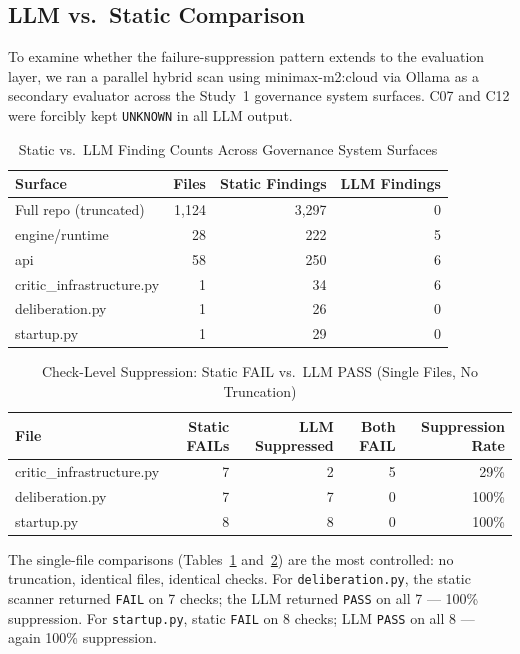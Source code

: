 \documentclass[11pt]{article}
\begin{document}
\subsection{LLM vs.\ Static Comparison}
\label{sec:llm}

To examine whether the failure-suppression pattern extends to the evaluation layer, we ran
a parallel hybrid scan using minimax-m2:cloud via Ollama as a secondary evaluator across the
Study~1 governance system surfaces. C07 and C12 were forcibly kept \texttt{UNKNOWN} in all
LLM output.

\begin{table}[htbp]
\centering
\caption{Static vs.\ LLM Finding Counts Across Governance System Surfaces}
\label{tab:llm}
\small
\begin{tabular}{@{}lrrr@{}}
\toprule
\textbf{Surface} & \textbf{Files} & \textbf{Static Findings} & \textbf{LLM Findings} \\
\midrule
Full repo (truncated) & 1,124 & 3,297 & 0 \\
engine/runtime & 28 & 222 & 5 \\
api & 58 & 250 & 6 \\
critic\_infrastructure.py & 1 & 34 & 6 \\
deliberation.py & 1 & 26 & 0 \\
startup.py & 1 & 29 & 0 \\
\bottomrule
\end{tabular}
\end{table}

\begin{table}[htbp]
\centering
\caption{Check-Level Suppression: Static FAIL vs.\ LLM PASS (Single Files, No Truncation)}
\label{tab:suppression}
\small
\begin{tabular}{@{}lrrrr@{}}
\toprule
\textbf{File} & \textbf{Static FAILs} & \textbf{LLM Suppressed} &
\textbf{Both FAIL} & \textbf{Suppression Rate} \\
\midrule
critic\_infrastructure.py & 7 & 2 & 5 & 29\% \\
deliberation.py & 7 & 7 & 0 & 100\% \\
startup.py & 8 & 8 & 0 & 100\% \\
\bottomrule
\end{tabular}
\end{table}

The single-file comparisons (Tables~\ref{tab:llm} and~\ref{tab:suppression}) are the most
controlled: no truncation, identical files, identical checks. For \texttt{deliberation.py},
the static scanner returned \texttt{FAIL} on 7 checks; the LLM returned \texttt{PASS} on
all 7 --- 100\% suppression. For \texttt{startup.py}, static \texttt{FAIL} on 8 checks;
LLM \texttt{PASS} on all 8 --- again 100\% suppression.
\end{document}
